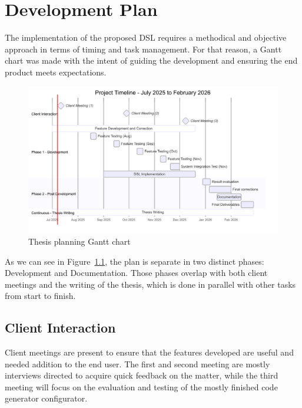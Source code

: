 
%

\chapter{Development Plan}
\label{sec:dev_plan}

The implementation of the proposed \gls{DSL} requires a methodical and objective approach in terms of timing and task management. For that reason, a Gantt chart was made with the intent of guiding the development and ensuring the end product meets expectations. 

\begin{figure}[htbp]
	\centering
	\includegraphics[height=0.63\textwidth]{gantt.png}
	\caption{Thesis planning Gantt chart}
	\label{fig:gantt}
\end{figure}

As we can see in Figure~\ref{fig:gantt}, the plan is separate in two distinct phases: Development and Documentation. Those phases overlap with both client meetings and the writing of the thesis, which is done in parallel with other tasks from start to finish.

\section{Client Interaction}
\label{sec:dev_plan_client}

Client meetings are present to ensure that the features developed are useful and needed addition to the end user. The first and second meeting are mostly interviews directed to acquire quick feedback on the matter, while the third meeting will focus on the evaluation and testing of the mostly finished code generator configurator.

